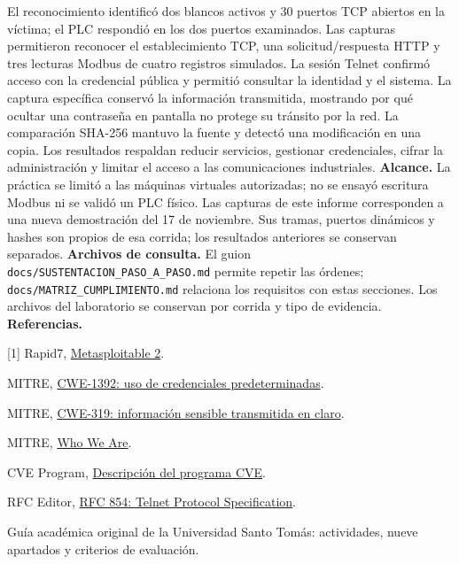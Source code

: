 \documentclass[11pt,a4paper]{article}
\begin{document}
El reconocimiento identificó dos blancos activos y 30 puertos TCP abiertos en la víctima; el PLC respondió en los dos puertos examinados. Las capturas permitieron reconocer el establecimiento TCP, una solicitud/respuesta HTTP y tres lecturas Modbus de cuatro registros simulados.
La sesión Telnet confirmó acceso con la credencial pública y permitió consultar la identidad y el sistema. La captura específica conservó la información transmitida, mostrando por qué ocultar una contraseña en pantalla no protege su tránsito por la red.
La comparación SHA-256 mantuvo la fuente y detectó una modificación en una copia. Los resultados respaldan reducir servicios, gestionar credenciales, cifrar la administración y limitar el acceso a las comunicaciones industriales.
\textbf{Alcance.} La práctica se limitó a las máquinas virtuales autorizadas; no se ensayó escritura Modbus ni se validó un PLC físico. Las capturas de este informe corresponden a una nueva demostración del 17 de noviembre. Sus tramas, puertos dinámicos y hashes son propios de esa corrida; los resultados anteriores se conservan separados.
\textbf{Archivos de consulta.} El guion \texttt{docs/SUSTENTACION\_PASO\_A\_PASO.md} permite repetir las órdenes; \texttt{docs/MATRIZ\_CUMPLIMIENTO.md} relaciona los requisitos con estas secciones. Los archivos del laboratorio se conservan por corrida y tipo de evidencia.
\textbf{Referencias.}\par
{\small\raggedright
[1] Rapid7, \href{https://docs.rapid7.com/metasploit/metasploitable-2/}{Metasploitable 2}.\par
[2] MITRE, \href{https://cwe.mitre.org/data/definitions/1392.html}{CWE-1392: uso de credenciales predeterminadas}.\par
[3] MITRE, \href{https://cwe.mitre.org/data/definitions/319.html}{CWE-319: información sensible transmitida en claro}.\par
[4] MITRE, \href{https://www.mitre.org/who-we-are}{Who We Are}.\par
[5] CVE Program, \href{https://www.cve.org/Resources/Media/Archives/OldWebsite/index.html}{Descripción del programa CVE}.\par
[6] RFC Editor, \href{https://www.rfc-editor.org/rfc/rfc854}{RFC 854: Telnet Protocol Specification}.\par
Guía académica original de la Universidad Santo Tomás: actividades, nueve apartados y criterios de evaluación.\par}
\end{document}

